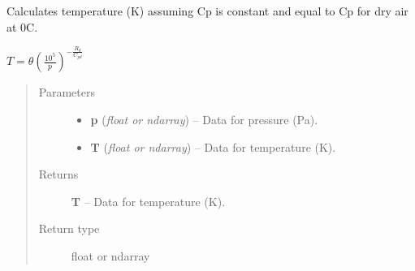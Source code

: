 \documentclass[letterpaper,10pt,english]{sphinxmanual}
\begin{document}
\begin{fulllineitems}
\label{atmos:atmos.equations.T_from_p_theta}
Calculates temperature (K) assuming Cp is constant and equal to Cp for dry air
at 0C.

\(T = \theta (\frac{10^5}{p})^{-\frac{R_d}{C_{pd}}}\)
\begin{quote}\begin{description}
\item[{Parameters}] \leavevmode\begin{itemize}
\item {} 
\textbf{p} (\emph{float or ndarray}) -- Data for pressure (Pa).

\item {} 
\textbf{T} (\emph{float or ndarray}) -- Data for temperature (K).

\end{itemize}

\item[{Returns}] \leavevmode
\textbf{T} --
Data for temperature (K).

\item[{Return type}] \leavevmode
float or ndarray

\end{description}\end{quote}

\end{fulllineitems}

\end{document}
